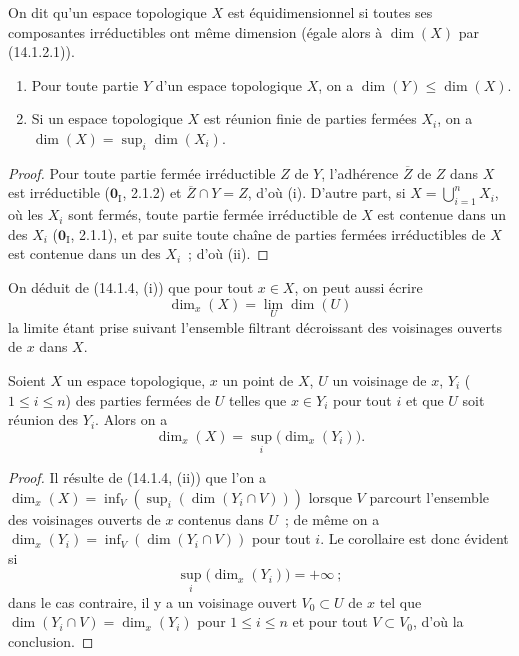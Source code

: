 \begin{definition}[14.1.3]
\label{0.14.1.3-fr}
On dit qu'un espace topologique $X$ est équidimensionnel si toutes ses
composantes irréductibles ont même dimension \textup{(égale alors à $\dim(X)$ par
(14.1.2.1))}.
\end{definition}

\begin{proposition}[14.1.4]
\label{0.14.1.4-fr}
\begin{enumerate}
  \item[\rm(i)] Pour toute partie $Y$ d'un espace topologique $X$, on a
  $\dim(Y)\leq\dim(X)$.
  \item[\rm(ii)] Si un espace topologique $X$ est réunion finie de parties
  fermées $X_i$, on a $\dim(X)=\sup_i\dim(X_i)$.
\end{enumerate}
\end{proposition}

\begin{proof}
Pour toute partie fermée irréductible $Z$ de $Y$, l'adhérence $\overline Z$ de
$Z$ dans $X$ est irréductible ($\mathbf{0}_{\mathrm I}$, 2.1.2) et
$\overline Z\cap Y=Z$, d'où (i). D'autre part, si
$X=\bigcup_{i=1}^n X_i$, où les $X_i$ sont fermés, toute partie fermée
irréductible de $X$ est contenue dans un des $X_i$ ($\mathbf{0}_{\mathrm I}$, 2.1.1),
et par suite toute chaîne de parties fermées irréductibles de $X$ est contenue
dans un des $X_i$~; d'où (ii).
\end{proof}

On déduit de (14.1.4, (i)) que pour tout $x\in X$, on peut aussi écrire
\[
  \dim_x(X)=\lim_U\dim(U)
  \tag{14.1.4.1}\label{0.14.1.4.1-fr}
\]
la limite étant prise suivant l'ensemble filtrant décroissant des voisinages
ouverts de $x$ dans $X$.

\begin{corollary}[14.1.5]
\label{0.14.1.5-fr}
Soient $X$ un espace topologique, $x$ un point de $X$, $U$ un voisinage de
$x$, $Y_i$ \textup{($1\leq i\leq n$)} des parties fermées de $U$ telles que
$x\in Y_i$ pour tout $i$ et que $U$ soit réunion des $Y_i$. Alors on a
\[
  \dim_x(X)=\sup_i\bigl(\dim_x(Y_i)\bigr).
  \tag{14.1.5.1}\label{0.14.1.5.1-fr}
\]
\end{corollary}

\begin{proof}
Il résulte de (14.1.4, (ii)) que l'on a
$\dim_x(X)=\inf_V(\sup_i(\dim(Y_i\cap V)))$ lorsque $V$ parcourt l'ensemble
des voisinages ouverts de $x$ contenus dans $U$~; de même on a
$\dim_x(Y_i)=\inf_V(\dim(Y_i\cap V))$ pour tout $i$. Le corollaire est donc
évident si
\[
  \sup_i\bigl(\dim_x(Y_i)\bigr)=+\infty~;
\]
dans le cas contraire, il y a un voisinage ouvert $V_0\subset U$ de $x$ tel
que $\dim(Y_i\cap V)=\dim_x(Y_i)$ pour $1\leq i\leq n$ et pour tout
$V\subset V_0$, d'où la conclusion.
\end{proof}

